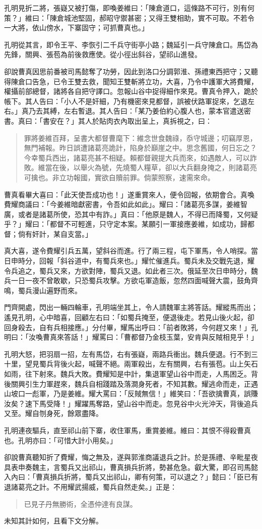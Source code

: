 孔明見折二將，張嶷又被打傷，即喚姜維曰：「陳倉道口，這條路不可行，別有何策？」維曰：「陳倉城池堅固，郝昭守禦甚密；又得王雙相助，實不可取。不若令一大將，依山傍水，下寨固守；可抓曹真也。」

孔明從其言，即令王平、李恢引二千兵守街亭小路；魏延引一兵守陳倉口。馬岱為先鋒，關興、張苞為前後救應使。從小徑出斜谷，望祁山進發。

卻說曹真因思前番被司馬懿奪了功勞，因此到洛口分調郭淮、孫禮東西把守；又聽得陳倉口告急，已令王雙去救，聞知王雙斬將立功，大喜，乃令中護軍大將費耀，權攝前部總督，諸將各自把守譯口。忽報山谷中捉得細作來見。曹真令押入，跪於帳下。其人告曰：「小人不是奸細，乃有機密來見都督，誤被伏路軍捉來，乞退左右。」真乃去其縛，左右暫退。其人告曰：「某乃姜伯約心腹人也，蒙本官遣送密書。真曰：「書安在？」其人於貼肉衣內取出呈上，真拆視之，曰：

\begin{quote}
罪將姜維百拜，呈書大都督曹麾下：維念世食魏祿，忝守城邊；叨竊厚恩，無門補報。昨日誤遭諸葛亮詭計，陷身於巔崖之中。思念舊國，何日忘之？今幸蜀兵西出，諸葛亮甚不相疑。賴都督親提大兵而來，如遇敵人，可以詐敗。維當在後，以舉火為號，先燒蜀人糧草，卻以大兵翻身掩之，則諸葛亮可擒也。非立功報國，實欲自贖前罪。倘蒙照察，速需來命。
\end{quote}

曹真看畢大喜曰：「此天使吾成功也！」遂重賞來人，便令回報，依期會合。真喚費耀商議曰：「今姜維暗獻密書，令吾如此如此」。耀曰：「諸葛亮多謀，姜維智廣，或者是諸葛所使，恐其中有詐。」真曰：「他原是魏人，不得已而降蜀，又何疑乎？」耀曰：「都督不可輕進，只守定本案。某願引一軍接應姜維，如成功，歸都督；倘有奸計，某自支當。」

真大喜，遂令費耀引兵五萬，望斜谷而進。行了兩三程，屯下軍馬，令人哨探。當日申時分，回報「斜谷道中，有蜀兵來也。」耀忙催進兵。蜀兵未及交戰先退，耀令兵追之，蜀兵又來，方欲對陣，蜀兵又退。如此者三次。俄延至次日申時分，魏兵一日一夜不曾敢歇，只恐蜀兵攻擊。方欲屯軍造飯，忽然四面喊聲大震，鼓角齊鳴，蜀兵漫山遍野而來。

門齊開處，閃出一輛四輪車，孔明端坐其上，令人請魏軍主將答話。耀縱馬而出；遙見孔明，心中暗喜，回顧左右曰：「如蜀兵掩至，便退後走。若見山後火起，卻回身殺去，自有兵相接應。」分付畢，耀馬出呼曰：「前者敗將，今何趕又來！」孔明曰：「汝喚曹真來答話！」耀罵曰：「曹都督乃金枝玉葉，安肯與反賊相見乎！」

孔明大怒，把羽扇一招，左有馬岱，右有張嶷，兩路兵衝出。魏兵便退。行不到三十里，望見蜀兵背後火起，喊聲不絕。兩軍殺出，左有關興，右有張苞。山上矢石如雨，往下射來。魏兵大敗。費耀知是中計，集退軍望山谷中而走，人馬困乏。背後關興引生力軍趕來，魏兵自相踐踏及落澗身死者，不知其數。耀逃命而走，正遇山坡口一彪軍，乃是姜維。耀大罵曰：「反賊無信！」維笑曰：「吾欲擒曹真，誤賺汝矣？速下馬受降！」耀躍馬奪路，望山谷中而走。忽見谷中火光沖天，背後追兵又至。耀自刎身死，餘眾盡降。

孔明連夜驅兵，直至祁山前下寨，收住軍馬，重賞姜維。維曰：其恨不得殺曹真也。孔明亦曰：「可惜大計小用矣。」

卻說曹真聽知折了費耀，悔之無及，遂與郭淮商議退兵之計。於是孫禮、辛毗星夜具表申奏魏主，言蜀兵又出祁山，曹真損兵折將，勢甚危急。叡大驚，即召司馬懿入內曰：「曹真損兵折將，蜀兵又出祁山，卿有何策，可以退之？」懿曰：「臣已有退諸葛亮之計。不用耀武揚威，蜀兵自然走矣。」正是：

\begin{quote}
已見子丹無勝術，全憑仲達有良謀。
\end{quote}

未知其計如何，且看下文分解。
